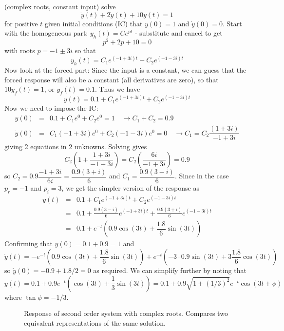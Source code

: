 \documentclass[12pt]{article}
\begin{document}
\begin{example} (complex roots, constant input) solve $$\ddot y(t) + 2 \dot y(t) + 10 y(t) = 1$$ for positive $t$ given initial conditions (IC) that $y(0)=1$ and $\dot y(0) = 0$. 
Start with the homogeneous part: $ y_h(t) = C e^{pt}$ - substitute and cancel to get 
$$
p^2+2p+10 = 0
$$
with roots $p=-1\pm3i$ so that 
$$
y_h(t) = C_1 e^{(-1 + 3i )t} + C_2 e^{(-1 - 3i)t} 
$$
Now look at the forced part: Since the input is a constant, we can guess that the forced response will also be a constant (all derivatives are zero), so that $10y_f(t) = 1$, or $y_f(t)=0.1$.
Thus we have 
$$
y(t) = 0.1 + C_1 e^{(-1 + 3i )t} + C_2 e^{(-1 - 3i)t}
$$
Now we need to impose the IC:
\begin{eqnarray}
y(0) &=& 0.1 + C_1 e^{0} + C_2 e^{0} = 1 \quad \to C_1+C_2 = 0.9\\
\dot y(0) &=& C_1 (-1+3i) e^{0} + C_2 (-1-3i) e^{0} = 0 \quad \to C_1 = C_2\dfrac{(1+3i)}{-1+3i}
\end{eqnarray}
giving 2 equations in 2 unknowns. Solving gives
$$
C_2 (1 + \dfrac{1+3i}{-1+3i}) =  C_2 (\dfrac{6i}{-1+3i}) = 0.9
$$
so $C_2 = 0.9 \dfrac{-1+3i}{6i} = \dfrac{0.9(3+i)}{6}$ and $C_1 = \dfrac{0.9(3-i)}{6}$. Since in the case $p_r=-1$ and $p_i=3$, we get the simpler version of the response as 
\begin{eqnarray}
y(t) &=& 0.1 + C_1 e^{(-1 + 3i )t} + C_2 e^{(-1 - 3i)t}\\
&=&  0.1 + \frac{0.9(3-i)}{6} e^{(-1 + 3i )t} + \frac{0.9(3+i)}{6} e^{(-1 - 3i)t}\\
&=& 0.1 + e^{-t}(0.9\cos(3t) + \dfrac{1.8}{6}\sin(3t)) \label{8}
\end{eqnarray}
Confirming that $y(0)=0.1+0.9=1$ and 
$$\dot y(t) = -e^{-t}(0.9\cos(3t) + \dfrac{1.8}{6}\sin(3t)) + e^{-t}(-3\cdot0.9\sin(3t) + 3\dfrac{1.8}{6}\cos(3t))$$
so $\dot y(0) = -0.9 + 1.8/2 = 0$ as required.
We can simplify further by noting that 
\begin{equation}
y(t) = 0.1 + 0.9e^{-t}(\cos(3t) + \dfrac{1}{3}\sin(3t)) = 0.1 + 0.9\sqrt{1+(1/3)^2}e^{-t}\cos(3t + \phi) \label{9}
\end{equation}
where $\tan \phi = -1/3$.

\begin{figure}
{\centering 
{}} \vspace*{-0.25in}
\caption{Response of second order system with complex roots. Compares two equivalent representations of the same solution.}
\end{figure}
\end{example}
\end{document}

